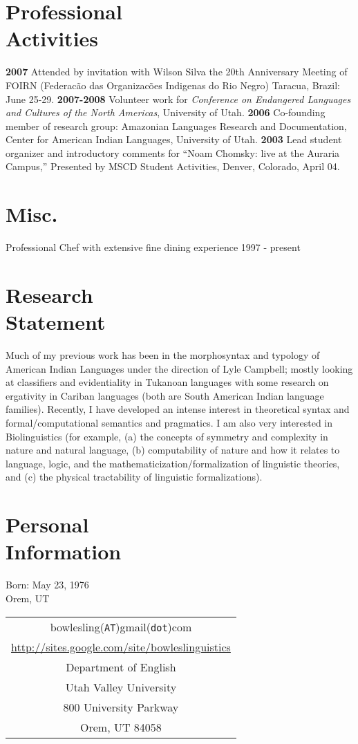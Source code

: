 \documentclass[margin,line]{resume}
\begin{document}
\begin{resume}
\section{Professional\\ Activities} 
{\bf 2007} Attended by invitation with Wilson Silva the 20th Anniversary Meeting of FOIRN (Federac\~ao das Organizac\~oes Indigenas do Rio Negro) Taracua, Brazil: June 25-29. {\bf 2007-2008} Volunteer work for \textsl{Conference on Endangered Languages and Cultures of the North Americas}, University of Utah. {\bf 2006} Co-founding member of research group: Amazonian Languages Research and Documentation, Center for American Indian Languages, University of Utah. {\bf 2003} Lead student organizer and introductory comments for ``Noam Chomsky: live at the Auraria Campus,'' Presented by MSCD Student Activities, Denver, Colorado, April 04.

\section{Misc.}
Professional Chef with extensive fine dining experience \hfill 1997 - present
 
\section{Research\\ Statement}
Much of my previous work has been in the morphosyntax and typology of American Indian Languages under the direction of Lyle Campbell; mostly looking at classifiers and evidentiality in Tukanoan languages with some research on ergativity in Cariban languages (both are South American Indian language families). Recently, I have developed an intense interest in theoretical syntax and formal/computational semantics and pragmatics. I am also very interested in Biolinguistics (for example, (a) the concepts of symmetry and complexity in nature and natural language, (b) computability of nature and how it relates to language, logic, and the mathematicization/formalization of linguistic theories, and (c) the physical tractability of linguistic formalizations).

\section{Personal\\ Information} 
Born: May 23, 1976\\
Orem, UT\\
\begin{tabular}{|c|}
	\hline
	bowlesling(\texttt{AT})gmail(\texttt{dot})com\\
\href{http://sites.google.com/site/bowleslinguistics}{http://sites.google.com/site/bowleslinguistics}\\
Department of English\\
Utah Valley University\\
800 University Parkway\\
Orem, UT 84058\\
\hline		
\end{tabular}

 \end{resume}
\end{document}
